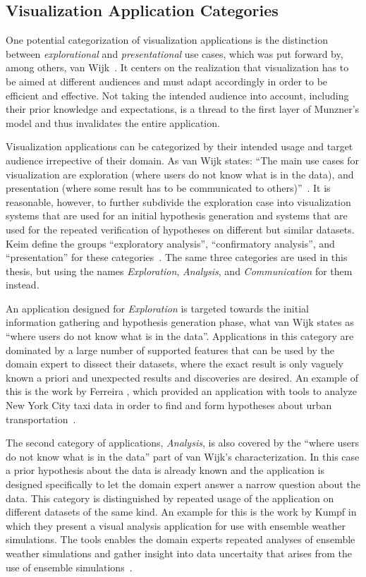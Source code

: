 \subsection{Visualization Application Categories} \label{cha:intro:appl:categories}
One potential categorization of visualization applications is the distinction between \emph{explorational} and \emph{presentational} use cases, which was put forward by, among others, van Wijk~\cite{van2005value}.  It centers on the realization that visualization has to be aimed at different audiences and must adapt accordingly in order to be efficient and effective.  Not taking the intended audience into account, including their prior knowledge and expectations, is a thread to the first layer of Munzner's model and thus invalidates the entire application.

Visualization applications can be categorized by their intended usage and target audience irrepective of their domain. As van Wijk states: ``The main use cases for visualization are exploration (where users do not know what is in the data), and presentation (where some result has to be communicated to others)''~\cite{van2005value}.  It is reasonable, however, to further subdivide the exploration case into visualization systems that are used for an initial hypothesis generation and systems that are used for the repeated verification of hypotheses on different but similar datasets.  Keim \etal define the groups ``exploratory analysis'', ``confirmatory analysis'', and ``presentation'' for these categories~\cite{keim2006challenges}.  The same three categories are used in this thesis, but using the names \emph{Exploration}, \emph{Analysis}, and \emph{Communication} for them instead.

An application designed for \emph{Exploration} is targeted towards the initial information gathering and hypothesis generation phase, what van Wijk states as ``where users do not know what is in the data''.  Applications in this category are dominated by a large number of supported features that can be used by the domain expert to dissect their datasets, where the exact result is only vaguely known a priori and unexpected results and discoveries are desired.  An example of this is the work by Ferreira \etal , which provided an application with tools to analyze New York City taxi data in order to find and form hypotheses about urban transportation~\cite{ferreira2013visual}.

The second category of applications, \emph{Analysis}, is also covered by the ``where users do not know what is in the data'' part of van Wijk's characterization.  In this case a prior hypothesis about the data is already known and the application is designed specifically to let the domain expert answer a narrow question about the data.  This category is distinguished by repeated usage of the application on different datasets of the same kind.  An example for this is the work by Kumpf \etal in which they present a visual analysis application for use with ensemble weather simulations.  The tools enables the domain experts repeated analyses of ensemble weather simulations and gather insight into data uncertaity that arises from the use of ensemble simulations~\cite{kumpf2018visualizing}.

